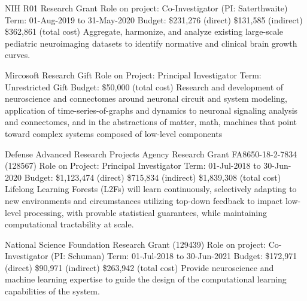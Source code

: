 \documentclass[10pt,colorlinks=true,urlcolor=blue]{moderncv}
\begin{document}
{\newline NIH R01 Research Grant 
\newline Role on project: Co-Investigator (PI: Saterthwaite)
\newline Term: 01-Aug-2019 to 31-May-2020
\newline Budget: \$231,276 (direct) \$131,585 (indirect) \$362,861 (total cost)
\newline Aggregate, harmonize, and analyze existing large-scale pediatric neuroimaging datasets to
identify normative and clinical brain growth curves.}{}{}{}{}

{\newline Mircosoft Research Gift
\newline Role on Project: Principal Investigator
\newline Term: Unrestricted Gift
\newline Budget: \$50,000 (total cost)
\newline Research and development of neuroscience and connectomes around neuronal circuit and
system modeling, application of time-series-of-graphs and dynamics to neuronal signaling
analysis and connectomes, and in the abstractions of matter, math, machines that point
toward complex systems composed of low-level components}{}{}{}{}

{\newline Defense Advanced Research Projects Agency Research Grant FA8650-18-2-7834
(128567)
\newline Role on Project: Principal Investigator
\newline Term: 01-Jul-2018 to 30-Jun-2020
\newline Budget: \$1,123,474 (direct) \$715,834 (indirect) \$1,839,308 (total cost)
\newline Lifelong Learning Forests (L2Fs) will learn continuously, selectively adapting to new
environments and circumstances utilizing top-down feedback to impact low-level
processing, with provable statistical guarantees, while maintaining computational tractability
at scale.}{}{}{}{}

{\newline National Science Foundation Research Grant (129439)
\newline Role on project: Co-Investigator (PI: Schuman)
\newline Term: 01-Jul-2018 to 30-Jun-2021
\newline Budget: \$172,971 (direct) \$90,971 (indirect) \$263,942 (total cost)
\newline Provide neuroscience and machine learning expertise to guide the design of the
computational learning capabilities of the system.}{}{}{}{}
\end{document}
